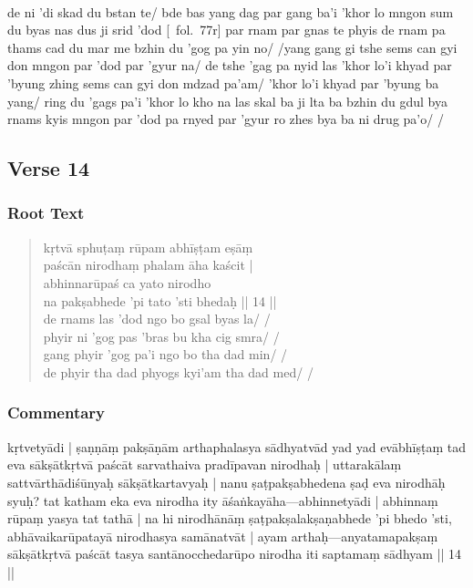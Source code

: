 \documentclass[12pt]{article}
\newcommand{\emdash} {\hspace{0em}—\hspace{0em}}
\begin{document}
\textbf{\TVB}\\
de ni 'di skad du bstan te/ bde bas yang dag par gang ba'i 'khor lo mngon sum du byas nas dus ji srid 'dod [\TVB\ fol.\ 77r] par rnam par gnas te phyis de rnam pa thams cad du mar me bzhin du 'gog pa yin no/ /yang gang gi tshe sems can gyi don mngon par 'dod par 'gyur na/ de tshe 'gag pa nyid las 'khor lo'i khyad par 'byung zhing sems can gyi don mdzad pa'am/ 'khor lo'i khyad par 'byung ba yang/ ring du 'gags pa'i 'khor lo kho na las skal ba ji lta ba bzhin du gdul bya rnams kyis mngon par 'dod pa rnyed par 'gyur ro zhes bya ba ni drug pa'o/ /

\subsection{Verse 14}
\subsubsection{Root Text}
\begin{quote}
	kṛtvā sphuṭaṃ rūpam abhīṣṭam eṣāṃ \\
	paścān nirodhaṃ phalam āha kaścit |\\
	abhinnarūpaś ca yato nirodho \\
	na pakṣabhede 'pi tato 'sti bhedaḥ || 14 ||\\

	de rnams las 'dod ngo bo gsal byas la/ /\\
	phyir ni 'gog pas 'bras bu kha cig smra/ /\\
	gang phyir 'gog pa'i ngo bo tha dad min/ /\\
	de phyir tha dad phyogs kyi'am tha dad med/ / 
\end{quote}

\subsubsection{Commentary}
kṛtvetyādi | ṣaṇṇāṃ pakṣāṇām arthaphalasya sādhyatvād yad yad evābhīṣṭaṃ tad eva sākṣātkṛtvā paścāt sarvathaiva pradīpavan nirodhaḥ | uttarakālaṃ sattvārthādiśūnyaḥ sākṣātkartavyaḥ | nanu ṣaṭpakṣabhedena ṣaḍ eva nirodhāḥ syuḥ? tat katham eka eva nirodha ity āśaṅkayāha\emdash abhinnetyādi | abhinnaṃ rūpaṃ yasya tat tathā | na hi nirodhānāṃ ṣaṭpakṣalakṣaṇabhede 'pi bhedo 'sti, abhāvaikarūpatayā nirodhasya samānatvāt | ayam arthaḥ\emdash anyatamapakṣaṃ sākṣātkṛtvā paścāt tasya santānocchedarūpo nirodha iti saptamaṃ sādhyam || 14 ||\\
\end{document}
